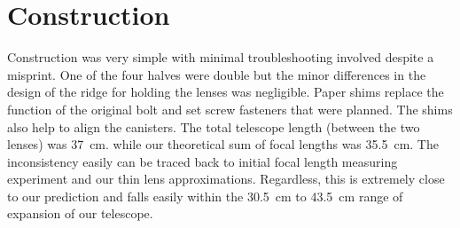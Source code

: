 \section{Construction}
\label{sec:Construction}
Construction was very simple with minimal troubleshooting involved despite a misprint. One of the four halves were double but the minor differences in the design of the ridge for holding the lenses was negligible. Paper shims replace the function of the original bolt and set screw fasteners that were planned. The shims also help to align the canisters. The total telescope length (between the two lenses) was \SI{37}{\centi\meter}. while our theoretical sum of focal lengths was \SI{35.5}{\centi\meter}. The inconsistency easily can be traced back to initial focal length measuring experiment and our thin lens approximations. Regardless, this is extremely close to our prediction and falls easily within the \SI{30.5}{\centi\meter} to \SI{43.5}{\centi\meter} range of expansion of our telescope.
